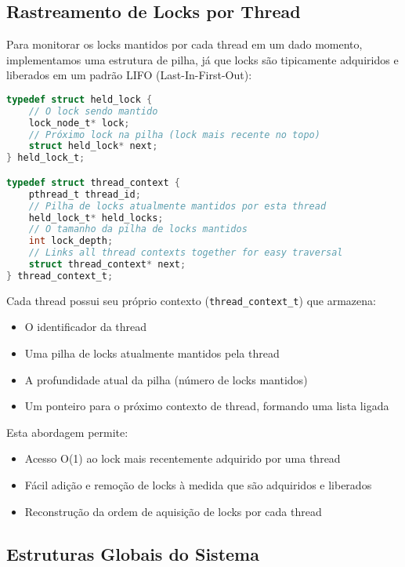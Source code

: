 \subsection{Rastreamento de Locks por Thread}

Para monitorar os locks mantidos por cada thread em um dado momento, implementamos uma estrutura de pilha, já que locks são tipicamente adquiridos e liberados em um padrão LIFO (Last-In-First-Out):

\begin{lstlisting}[language=C, caption={Estrutura de pilha para rastreamento de locks}]
typedef struct held_lock {
    // O lock sendo mantido
    lock_node_t* lock;
    // Próximo lock na pilha (lock mais recente no topo)
    struct held_lock* next;
} held_lock_t;

typedef struct thread_context {
    pthread_t thread_id;
    // Pilha de locks atualmente mantidos por esta thread
    held_lock_t* held_locks;
    // O tamanho da pilha de locks mantidos
    int lock_depth;
    // Links all thread contexts together for easy traversal
    struct thread_context* next;
} thread_context_t;
\end{lstlisting}

Cada thread possui seu próprio contexto (\texttt{thread\_context\_t}) que armazena:
\begin{itemize}
    \item O identificador da thread
    \item Uma pilha de locks atualmente mantidos pela thread
    \item A profundidade atual da pilha (número de locks mantidos)
    \item Um ponteiro para o próximo contexto de thread, formando uma lista ligada
\end{itemize}

Esta abordagem permite:
\begin{itemize}
    \item Acesso O(1) ao lock mais recentemente adquirido por uma thread
    \item Fácil adição e remoção de locks à medida que são adquiridos e liberados
    \item Reconstrução da ordem de aquisição de locks por cada thread
\end{itemize}

\subsection{Estruturas Globais do Sistema}

